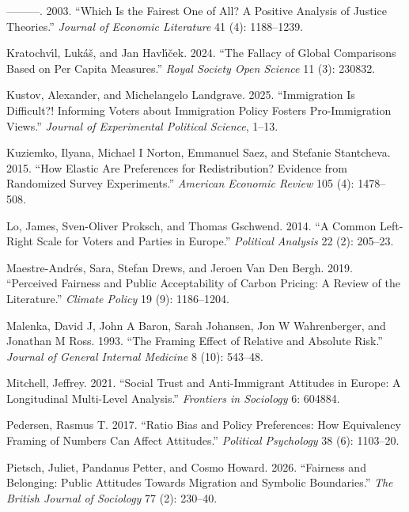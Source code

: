 \documentclass[
  12pt,
  a4paper,
]{article}
\newlength{\cslhangindent}
\newenvironment{CSLReferences}[2] %
 {\begin{list}{}{%
  \setlength{\itemindent}{0pt}
  \setlength{\leftmargin}{0pt}
  \setlength{\parsep}{0pt}
  \ifodd #1
   \setlength{\leftmargin}{\cslhangindent}
   \setlength{\itemindent}{-1\cslhangindent}
  \fi
  \setlength{\itemsep}{#2\baselineskip}}}
 {\end{list}}
\begin{document}
\begin{CSLReferences}{1}{0}
---------. 2003. {``Which Is the Fairest One of All? A Positive Analysis of Justice Theories.''} \emph{Journal of Economic Literature} 41 (4): 1188--1239.

Kratochvı́l, Lukáš, and Jan Havlı́ček. 2024. {``The Fallacy of Global Comparisons Based on Per Capita Measures.''} \emph{Royal Society Open Science} 11 (3): 230832.

Kustov, Alexander, and Michelangelo Landgrave. 2025. {``Immigration Is Difficult?! Informing Voters about Immigration Policy Fosters Pro-Immigration Views.''} \emph{Journal of Experimental Political Science}, 1--13.

Kuziemko, Ilyana, Michael I Norton, Emmanuel Saez, and Stefanie Stantcheva. 2015. {``How Elastic Are Preferences for Redistribution? Evidence from Randomized Survey Experiments.''} \emph{American Economic Review} 105 (4): 1478--508.

Lo, James, Sven-Oliver Proksch, and Thomas Gschwend. 2014. {``A Common Left-Right Scale for Voters and Parties in Europe.''} \emph{Political Analysis} 22 (2): 205--23.

Maestre-Andrés, Sara, Stefan Drews, and Jeroen Van Den Bergh. 2019. {``Perceived Fairness and Public Acceptability of Carbon Pricing: A Review of the Literature.''} \emph{Climate Policy} 19 (9): 1186--1204.

Malenka, David J, John A Baron, Sarah Johansen, Jon W Wahrenberger, and Jonathan M Ross. 1993. {``The Framing Effect of Relative and Absolute Risk.''} \emph{Journal of General Internal Medicine} 8 (10): 543--48.

Mitchell, Jeffrey. 2021. {``Social Trust and Anti-Immigrant Attitudes in Europe: A Longitudinal Multi-Level Analysis.''} \emph{Frontiers in Sociology} 6: 604884.

Pedersen, Rasmus T. 2017. {``Ratio Bias and Policy Preferences: How Equivalency Framing of Numbers Can Affect Attitudes.''} \emph{Political Psychology} 38 (6): 1103--20.

Pietsch, Juliet, Pandanus Petter, and Cosmo Howard. 2026. {``Fairness and Belonging: Public Attitudes Towards Migration and Symbolic Boundaries.''} \emph{The British Journal of Sociology} 77 (2): 230--40.


\end{CSLReferences}
\end{document}
